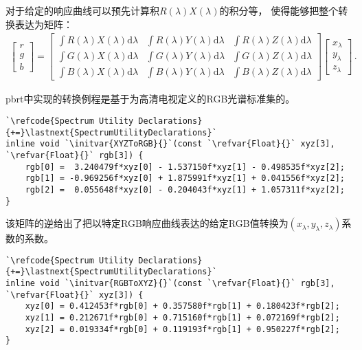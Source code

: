 对于给定的响应曲线可以预先计算积$R(\lambda)X(\lambda)$的积分等，
使得能够把整个转换表达为矩阵：
\begin{align*}
    \left[\begin{array}{c}
            r \\ g\\ b
        \end{array}\right]=\left[
        \begin{array}{ccc}
            \int R(\lambda)X(\lambda)\mathrm{d}\lambda & \int R(\lambda)Y(\lambda)\mathrm{d}\lambda & \int R(\lambda)Z(\lambda)\mathrm{d}\lambda \\
            \int G(\lambda)X(\lambda)\mathrm{d}\lambda & \int G(\lambda)Y(\lambda)\mathrm{d}\lambda & \int G(\lambda)Z(\lambda)\mathrm{d}\lambda \\
            \int B(\lambda)X(\lambda)\mathrm{d}\lambda & \int B(\lambda)Y(\lambda)\mathrm{d}\lambda & \int B(\lambda)Z(\lambda)\mathrm{d}\lambda
        \end{array}
        \right]\left[\begin{array}{c}
            x_{\lambda} \\ y_{\lambda} \\ z_{\lambda}
        \end{array}\right]\, .
\end{align*}

pbrt中实现的转换例程是基于为高清电视定义的RGB光谱标准集的。
\begin{lstlisting}
`\refcode{Spectrum Utility Declarations}{+=}\lastnext{SpectrumUtilityDeclarations}`
inline void `\initvar{XYZToRGB}{}`(const `\refvar{Float}{}` xyz[3], `\refvar{Float}{}` rgb[3]) {
    rgb[0] =  3.240479f*xyz[0] - 1.537150f*xyz[1] - 0.498535f*xyz[2];
    rgb[1] = -0.969256f*xyz[0] + 1.875991f*xyz[1] + 0.041556f*xyz[2];
    rgb[2] =  0.055648f*xyz[0] - 0.204043f*xyz[1] + 1.057311f*xyz[2];
}
\end{lstlisting}

该矩阵的逆给出了把以特定RGB响应曲线表达的给定RGB值转换为$(x_{\lambda},y_{\lambda},z_{\lambda})$系数的系数。
\begin{lstlisting}
`\refcode{Spectrum Utility Declarations}{+=}\lastnext{SpectrumUtilityDeclarations}`
inline void `\initvar{RGBToXYZ}{}`(const `\refvar{Float}{}` rgb[3], `\refvar{Float}{}` xyz[3]) {
    xyz[0] = 0.412453f*rgb[0] + 0.357580f*rgb[1] + 0.180423f*rgb[2];
    xyz[1] = 0.212671f*rgb[0] + 0.715160f*rgb[1] + 0.072169f*rgb[2];
    xyz[2] = 0.019334f*rgb[0] + 0.119193f*rgb[1] + 0.950227f*rgb[2];
}
\end{lstlisting}

